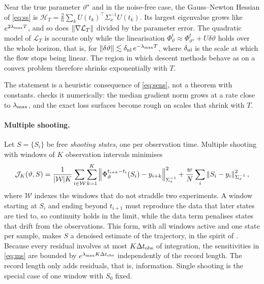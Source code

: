 \begin{proposition}\label{prop:basin}
Near the true parameter $\vartheta^\star$ and in the noise-free case, the Gauss--Newton Hessian of \eqref{eq:ss} is $\mathcal H_T=\frac{2}{n}\sum_k U(t_k)^\top\Sigma_x^{-1}U(t_k)$. Its largest eigenvalue grows like $e^{2\lambda_{\max} T}$, and so does $\left\lVert \nabla\mathcal L_T\right\rVert$ divided by the parameter error. The quadratic model of $\mathcal L_T$ is accurate only while the linearisation $\Phi^t_{\vartheta}\approx\Phi^t_{\vartheta^\star}+U\delta\vartheta$ holds over the whole horizon, that is, for $\left\lVert \delta\vartheta\right\rVert\lesssim \delta_{\rm nl}\,e^{-\lambda_{\max} T}$, where $\delta_{\rm nl}$ is the scale at which the flow stops being linear. The region in which descent methods behave as on a convex problem therefore shrinks exponentially with $T$.
\end{proposition}
The statement is a heuristic consequence of \eqref{eq:sens}, not a theorem with constants.  checks it numerically: the median gradient norm grows at a rate close to $\lambda_{\max}$, and the exact loss surfaces become rough on scales that shrink with $T$.

\paragraph{Multiple shooting.} Let $S=\{S_i\}$ be free \emph{shooting states}, one per observation time. Multiple shooting with windows of $K$ observation intervals minimises
\begin{equation}\label{eq:ms}
  \mathcal J_K(\vartheta,S) = \frac{1}{|\mathcal W|K}\sum_{i\in\mathcal W}\sum_{k=1}^{K}\left\lVert \Phi^{t_{i+k}-t_i}_\vartheta(S_i)-y_{i+k}\right\rVert^2_{\Sigma_x^{-1}} + \frac{w}{N}\sum_{i}\left\lVert S_i-y_i\right\rVert^2_{\Sigma_x^{-1}},
\end{equation}
where $\mathcal W$ indexes the windows that do not straddle two experiments. A window starting at $S_i$ and ending beyond $t_{i+1}$ must reproduce the data that later states are tied to, so continuity holds in the limit, while the data term penalises states that drift from the observations. This form, with all windows active and one state per sample, makes $S$ a denoised estimate of the trajectory, in the spirit of \textcite{rudy2019denoising}. Because every residual involves at most $K\Delta t_{\mathrm{obs}}$ of integration, the sensitivities in \eqref{eq:ms} are bounded by $e^{\lambda_{\max} K\Delta t_{\mathrm{obs}}}$ independently of the record length. The record length only adds residuals, that is, information. Single shooting is the special case of one window with $S_0$ fixed.

